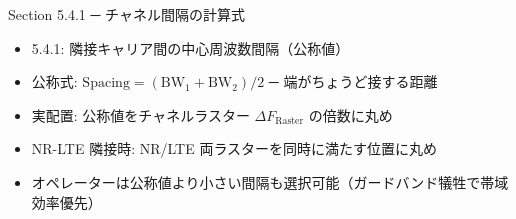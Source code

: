 \begin{frame}{Section 5.4.1 ─ チャネル間隔の計算式}
\begin{itemize}
  \item 5.4.1: 隣接キャリア間の中心周波数間隔（公称値）
  \item 公称式: $\mathrm{Spacing} = (\mathrm{BW}_1 + \mathrm{BW}_2)/2$ ─ 端がちょうど接する距離
  \item 実配置: 公称値をチャネルラスター $\Delta F_{\mathrm{Raster}}$ の倍数に丸め
  \item NR-LTE 隣接時: NR/LTE 両ラスターを同時に満たす位置に丸め
  \item オペレーターは公称値より小さい間隔も選択可能（ガードバンド犠牲で帯域効率優先）
\end{itemize}
\end{frame}
